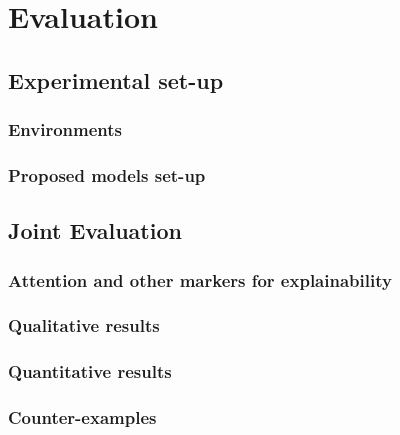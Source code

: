 \chapter{Evaluation}
\label{cha:evaluation}

\section{Experimental set-up}
\label{sec:exp_setup}

\subsection{Environments}
\label{sec:env_setup}

\subsection{Proposed models set-up}
\label{sec:models_setup}

\section{Joint Evaluation}
\label{sec:joint_ev}

\subsection{Attention and other markers for explainability}
\label{sec:joint_attn_explainability}

\subsection{Qualitative results}
\label{sec:joint_qual_explainability}

\subsection{Quantitative results}
\label{sec:joint_quant_explainability}

\subsection{Counter-examples}
\label{sec:counter_examples}

%

